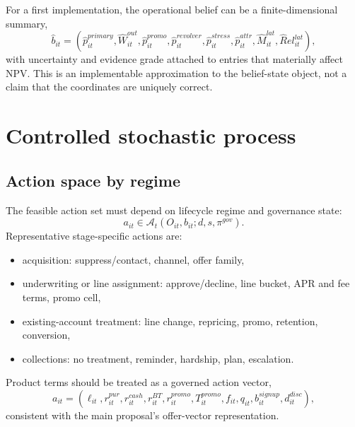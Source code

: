 \documentclass[11pt]{article}
\newcommand{\1}{\mathbf{1}}
\theoremstyle{definition}
\begin{document}
For a first implementation, the operational belief can be a finite-dimensional
summary,
\begin{equation}
  \widehat b_{it}
  =
  (\widehat p^{primary}_{it},\widehat W^{out}_{it},
   \widehat p^{promo}_{it},\widehat p^{revolver}_{it},
   \widehat p^{stress}_{it},\widehat p^{attr}_{it},
   \widehat M^{lat}_{it},\widehat Rel^{lat}_{it}),
  \label{eq:operational-belief}
\end{equation}
with uncertainty and evidence grade attached to entries that materially affect
NPV. This is an implementable approximation to the belief-state object, not a
claim that the coordinates are uniquely correct.

\section{Controlled stochastic process}

\subsection{Action space by regime}

The feasible action set must depend on lifecycle regime and governance state:
\begin{equation}
  a_{it}\in\mathcal{A}_t(O_{it},b_{it};d,s,\pi^{gov}).
  \label{eq:feasible-actions}
\end{equation}
Representative stage-specific actions are:
\begin{itemize}[leftmargin=*]
  \item acquisition: suppress/contact, channel, offer family,
  \item underwriting or line assignment: approve/decline, line bucket, APR and
        fee terms, promo cell,
  \item existing-account treatment: line change, repricing, promo, retention,
        conversion,
  \item collections: no treatment, reminder, hardship, plan, escalation.
\end{itemize}

Product terms should be treated as a governed action vector,
\begin{equation}
  a_{it}
  =
  (\ell_{it},r^{pur}_{it},r^{cash}_{it},r^{BT}_{it},r^{promo}_{it},
   T^{promo}_{it},f_{it},q_{it},b_{it}^{signup},d_{it}^{disc}),
  \label{eq:action-vector}
\end{equation}
consistent with the main proposal's offer-vector representation.
\end{document}
